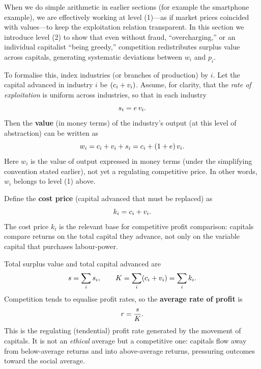 When we do simple arithmetic in earlier sections (for example the smartphone example), we are effectively working at level (1)---as if market prices coincided with values---to keep the exploitation relation transparent.
In this section we introduce level (2) to show that even without fraud, ``overcharging,'' or an individual capitalist ``being greedy,''
competition redistributes surplus value across capitals, generating systematic deviations between $w_i$ and $p_i$.

To formalise this, index industries (or branches of production) by $i$.
Let the capital advanced in industry $i$ be $(c_i + v_i)$.
Assume, for clarity, that the \emph{rate of exploitation} is uniform across industries,
so that in each industry
\[
  s_i = e\,v_i.
\]
Then the \textbf{value} (in money terms) of the industry's output (at this level of abstraction)
can be written as
\begin{equation}
  w_i = c_i + v_i + s_i
      = c_i + (1+e)\,v_i.
  \label{eq:value-output-industry}
\end{equation}
Here $w_i$ is the value of output expressed in money terms (under the simplifying convention stated earlier),
not yet a regulating competitive price. In other words, $w_i$ belongs to level (1) above.

Define the \textbf{cost price} (capital advanced that must be replaced) as
\begin{equation}
  k_i = c_i + v_i.
  \label{eq:cost-price}
\end{equation}
The cost price $k_i$ is the relevant base for competitive profit comparison: capitals compare returns on the total capital they advance,
not only on the variable capital that purchases labour-power.

Total surplus value and total capital advanced are
\[
  s = \sum_i s_i,
  \qquad
  K = \sum_i (c_i + v_i) = \sum_i k_i.
\]
Competition tends to equalise profit rates, so the \textbf{average rate of profit} is
\begin{equation}
  r = \frac{s}{K}.
  \label{eq:average-profit-rate}
\end{equation}
This is the regulating (tendential) profit rate generated by the movement of capitals.
It is not an \emph{ethical} average but a competitive one: capitals flow away from below-average returns and into above-average returns,
pressuring outcomes toward the social average.

